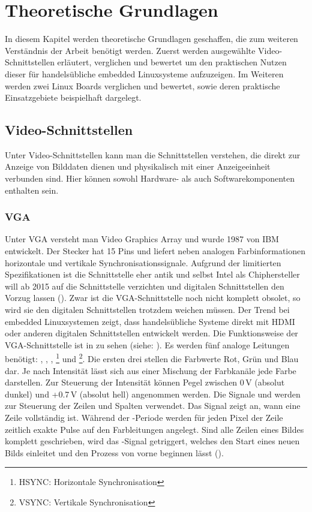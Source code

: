 \chapter{Theoretische Grundlagen}
\label{cha:Grundlagen}
In diesem Kapitel werden theoretische Grundlagen geschaffen, die zum weiteren Verständnis der Arbeit benötigt werden. Zuerst werden ausgewählte Video-Schnittstellen erläutert, verglichen und bewertet um den praktischen Nutzen dieser für handelsübliche embedded Linuxsysteme aufzuzeigen. Im Weiteren werden zwei Linux Boards verglichen und bewertet, sowie deren praktische Einsatzgebiete beispielhaft dargelegt.

\section{Video-Schnittstellen}
Unter Video-Schnittstellen kann man die Schnittstellen verstehen, die direkt zur Anzeige von Bilddaten dienen und physikalisch mit einer Anzeigeeinheit verbunden sind. Hier können sowohl Hardware- als auch Softwarekomponenten enthalten sein.
\subsection{VGA}
Unter VGA versteht man Video Graphics Array und wurde 1987 von IBM entwickelt. Der Stecker hat 15 Pins und liefert neben analogen Farbinformationen horizontale und vertikale Synchronisationssignale. Aufgrund der limitierten Spezifikationen ist die Schnittstelle eher antik und selbst Intel als Chiphersteller will ab 2015 auf die Schnittstelle verzichten  und digitalen Schnittstellen den Vorzug lassen (\cite{Intel2010}). Zwar ist die VGA-Schnittstelle noch nicht komplett obsolet, so wird sie den digitalen Schnittstellen trotzdem weichen müssen. Der Trend bei embedded Linuxsystemen zeigt, dass handelsübliche Systeme direkt mit HDMI oder anderen digitalen Schnittstellen entwickelt werden.
Die Funktionsweise der VGA-Schnittstelle ist in  zu sehen (siehe: \cite{Valcarce2011}). Es werden fünf analoge Leitungen benötigt: , , , \footnote{HSYNC: Horizontale Synchronisation} und \footnote{VSYNC: Vertikale Synchronisation}. Die ersten drei stellen die Farbwerte Rot, Grün und Blau dar. Je nach Intensität lässt sich aus einer Mischung der Farbkanäle jede Farbe darstellen. Zur Steuerung der Intensität können Pegel zwischen 0\,V (absolut dunkel) und +0.7\,V (absolut hell) angenommen werden. Die Signale  und  werden zur Steuerung der Zeilen und Spalten verwendet. Das Signal  zeigt an, wann eine Zeile vollständig ist. Während der -Periode werden für jeden Pixel der Zeile zeitlich exakte Pulse auf den Farbleitungen angelegt. Sind alle Zeilen eines Bildes komplett geschrieben, wird das -Signal getriggert, welches den Start eines neuen Bilds einleitet und den Prozess von vorne beginnen lässt (\cite{Valcarce2011}).

